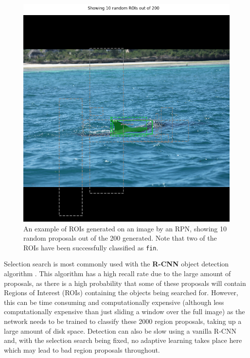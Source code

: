 \begin{figure}
	\begin{center}
		\includegraphics[scale=0.45]{Chapter2/figs/rpn-ten-random.png}
	\end{center}
	\caption{An example of ROIs generated on an image by an RPN, showing 10 random proposals out of the 200 generated. Note that two of the ROIs have been successfully classified as \texttt{fin}.}
	\label{fig:rpn-randoms}
\end{figure}

Selection search is most commonly used with the \textbf{R-CNN} object detection algorithm \cite{girshick_rich_2014}. This algorithm has a high recall rate due to the large amount of proposals, as there is a high probability that some of these proposals will contain Regions of Interest (ROIs) containing the objects being searched for. However, this can be time consuming and computationally expensive (although less computationally expensive than just sliding a window over the full image) as the network needs to be trained to classify these 2000 region proposals, taking up a large amount of disk space. Detection can also be slow using a vanilla R-CNN and, with the selection search being fixed, no adaptive learning takes place here which may lead to bad region proposals throughout. 

